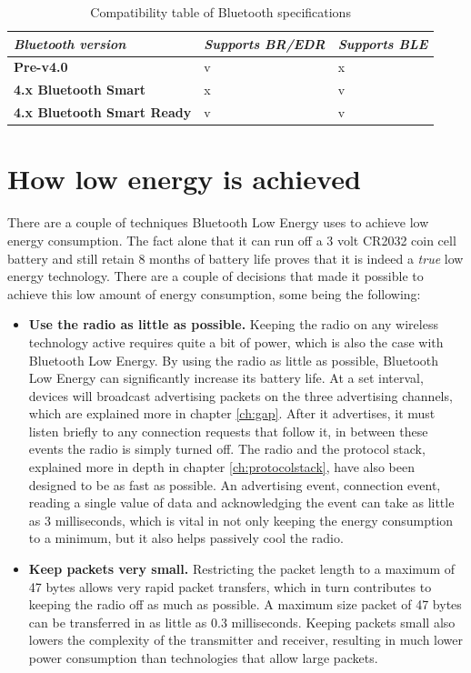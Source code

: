 \documentclass[pdftex,a4paper,12pt,twoside]{report}
\begin{document}
\begin{table}[]
\centering
\caption{Compatibility table of Bluetooth specifications}
\label{table:configurations}
\begin{tabular}{|l|l|l|}
\hline
\textit{\textbf{Bluetooth version}} & \textit{\textbf{Supports BR/EDR}} & \textit{\textbf{Supports BLE}} \\ \hline
\textbf{Pre-v4.0}                   & v                                 & x                              \\ \hline
\textbf{4.x Bluetooth Smart}        & x                                 & v                              \\ \hline
\textbf{4.x Bluetooth Smart Ready}  & v                                 & v                              \\ \hline
\end{tabular}
\end{table}

\section{How low energy is achieved}
\label{sec:lowenergy}
There are a couple of techniques Bluetooth Low Energy uses to achieve low energy consumption. The fact alone that it can run off a 3 volt CR2032 coin cell battery and still retain 8 months of battery life proves that it is indeed a \textit{true} low energy technology. There are a couple of decisions that made it possible to achieve this low amount of energy consumption, some being the following:

\begin{itemize}
\item{\textbf{Use the radio as little as possible.} Keeping the radio on any wireless technology active requires quite a bit of power, which is also the case with Bluetooth Low Energy. By using the radio as little as possible, Bluetooth Low Energy can significantly increase its battery life. At a set interval, devices will broadcast advertising packets on the three advertising channels, which are explained more in chapter \ref{ch:gap}. After it advertises, it must listen briefly to any connection requests that follow it, in between these events the radio is simply turned off. The radio and the protocol stack, explained more in depth in chapter \ref{ch:protocolstack}, have also been designed to be as fast as possible. An advertising event, connection event, reading a single value of data and acknowledging the event can take as little as 3 milliseconds, which is vital in not only keeping the energy consumption to a minimum, but it also helps passively cool the radio.}

\item{\textbf{Keep packets very small.} Restricting the packet length to a maximum of 47 bytes allows very rapid packet transfers, which in turn contributes to keeping the radio off as much as possible. A maximum size packet of 47 bytes can be transferred in as little as 0.3 milliseconds. Keeping packets small also lowers the complexity of the transmitter and receiver, resulting in much lower power consumption than technologies that allow large packets.}
\end{itemize}
\end{document}
